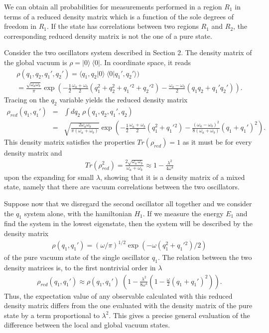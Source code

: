 \documentclass[11pt, nofootinbib]{revtex4-2}
\newcommand{\bea}{\begin{eqnarray}}
\newcommand{\eea}{\end{eqnarray}}
\begin{document}
We can obtain all probabilities for measurements performed in a region
$R_{1}$ in terms of a reduced density matrix which is a function of the
sole degrees of freedom in $R_{1}$.  If the state has correlations
between two regions $R_{1}$ and $R_{2}$, the corresponding reduced
density matrix is not the one of a pure state.

Consider the two oscillators system described in Section 2.  The
density matrix of the global vacuum is $\rho=|0\rangle\ \langle 0|$. 
In coordinate space, it reads
%
\begin{multline}
\rho(q_1,q_2,q_1',q_2') = \langle 
q_1,q_2|0\rangle\ \langle 0|q_1',q_2'\rangle) \\
= \frac{\sqrt{\omega_a \omega_b}}{{\pi}} \exp \left( 
-\frac{1}{2}\frac{\omega_a + \omega_b}{2} 
(q_1^2+q_2^2+q_1'{}^2+q_2'{}^2) -\frac{\omega_a  - \omega_b}{2} (q_1 q_2 
+q_1' q_2') \right).
\end{multline}
%
Tracing on the $q_{2}$ variable yields the reduced density matrix
%
\bea
\rho_{red} (q_1,q_1') &=& \int dq_2 \; \rho(q_1,q_2,q_1',q_2) \\
&=&  \sqrt{\frac{2\omega_a \omega_b}{\pi (\omega_a + \omega_b)}} \exp 
\left( -\frac{1}{2}\frac{\omega_a  + \omega_b}{2} (q_1^2+q_1'{}^2) 
-\frac{(\omega_a  - \omega_b)^2}{8 (\omega_a + \omega_b)} (q_1  +q_1' 
)^2 \right).
\eea
%
This density matrix satisfies the properties $Tr(\rho_{red})=1$ as it 
must be for every density matrix and
%
\bea
Tr(\rho_{red}^2) =  \frac{2\sqrt{\omega_a \, \omega_b}}{\omega_a + 
\omega_b} \approx 1 -\frac{\lambda^2}{4 \omega^4}
\eea
%
upon the expanding for small $\lambda$, showing that it is a density
matrix of a mixed state, namely that there are vacuum correlations
between the two oscillators.  

Suppose now that we disregard the second oscillator all together and we
consider the $q_{1}$ system alone, with the hamiltonian $H_{1}$.  If 
we measure the energy $E_{1}$ and find the system in the lowest 
eigenstate, then the system will be described by the 
density matrix 
%
\bea
\rho(q_1,q_1')=
(\omega/\pi)^{1/2} \exp \left( -\omega (q_1^2+q_1'{}^ 2)/2\right)
\eea
%
of the pure vacuum state of the single oscillator $q_1$.  The relation
between the two density matrices is, to the first nontrivial order in
$\lambda$
%
\bea
\rho_{red} (q_1,q_1') \approx \rho (q_1,q_1') \; \left(1 - 
\frac{\lambda^2}{8 \omega^4}\left(1-\frac{\omega}{2}(q_1+q_1')^2 
\right) \right).
\eea
%
Thus, the expectation value of any observable calculated with this
reduced density matrix differs from the one evaluated with the density
matrix of the pure state by a term proportional to $\lambda^2$.  This
gives a precise general evaluation of the difference between the 
local and global vacuum states. 
\end{document}
